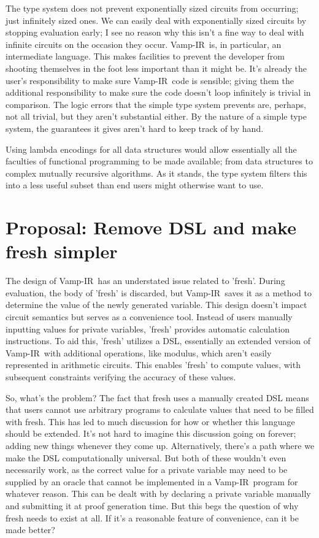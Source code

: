 \documentclass{msc}
\newcommand{\vampir}{Vamp-IR}
\begin{document}
The type system does not prevent exponentially sized circuits from occurring; just infinitely sized ones. We can easily deal with exponentially sized circuits by stopping evaluation early; I see no reason why this isn't a fine way to deal with infinite circuits on the occasion they occur. \vampir\ is, in particular, an intermediate language. This makes facilities to prevent the developer from shooting themselves in the foot less important than it might be. It's already the user's responsibility to make sure \vampir\ code is sensible; giving them the additional responsibility to make sure the code doesn't loop infinitely is trivial in comparison. The logic errors that the simple type system prevents are, perhaps, not all trivial, but they aren't substantial either. By the nature of a simple type system, the guarantees it gives aren't hard to keep track of by hand.

Using lambda encodings for all data structures would allow essentially all the faculties of functional programming to be made available; from data structures to complex mutually recursive algorithms. As it stands, the type system filters this into a less useful subset than end users might otherwise want to use.

\section{Proposal: Remove DSL and make fresh simpler}

The design of \vampir\ has an understated issue related to 'fresh'. During evaluation, the body of 'fresh' is discarded, but \vampir\ saves it as a method to determine the value of the newly generated variable. This design doesn't impact circuit semantics but serves as a convenience tool. Instead of users manually inputting values for private variables, 'fresh' provides automatic calculation instructions. To aid this, 'fresh' utilizes a DSL, essentially an extended version of \vampir\ with additional operations, like modulus, which aren't easily represented in arithmetic circuits. This enables 'fresh' to compute values, with subsequent constraints verifying the accuracy of these values.

So, what's the problem? The fact that fresh uses a manually created DSL means that users cannot use arbitrary programs to calculate values that need to be filled with fresh. This has led to much discussion for how or whether this language should be extended. It's not hard to imagine this discussion going on forever; adding new things whenever they come up. Alternatively, there's a path where we make the DSL computationally universal. But both of these wouldn't even necessarily work, as the correct value for a private variable may need to be supplied by an oracle that cannot be implemented in a \vampir\ program for whatever reason. This can be dealt with by declaring a private variable manually and submitting it at proof generation time. But this begs the question of why fresh needs to exist at all. If it's a reasonable feature of convenience, can it be made better?
\end{document}
